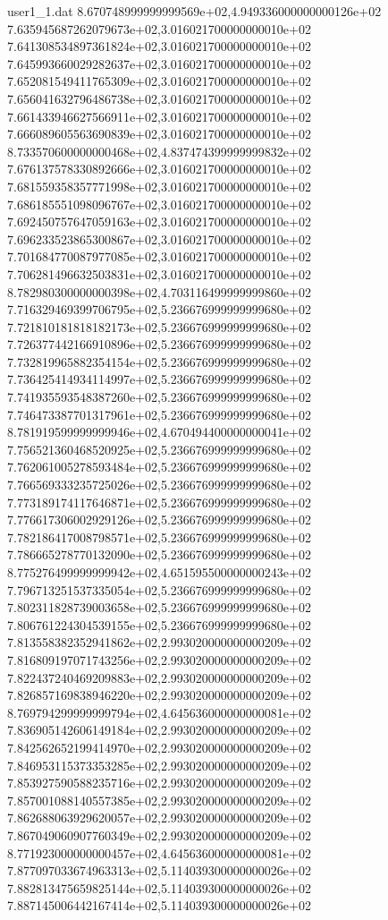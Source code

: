 \begin{filecontents}{user1_1.dat}
8.670748999999999569e+02,4.949336000000000126e+02
7.635945687262079673e+02,3.016021700000000010e+02
7.641308534897361824e+02,3.016021700000000010e+02
7.645993660029282637e+02,3.016021700000000010e+02
7.652081549411765309e+02,3.016021700000000010e+02
7.656041632796486738e+02,3.016021700000000010e+02
7.661433946627566911e+02,3.016021700000000010e+02
7.666089605563690839e+02,3.016021700000000010e+02
8.733570600000000468e+02,4.837474399999999832e+02
7.676137578330892666e+02,3.016021700000000010e+02
7.681559358357771998e+02,3.016021700000000010e+02
7.686185551098096767e+02,3.016021700000000010e+02
7.692450757647059163e+02,3.016021700000000010e+02
7.696233523865300867e+02,3.016021700000000010e+02
7.701684770087977085e+02,3.016021700000000010e+02
7.706281496632503831e+02,3.016021700000000010e+02
8.782980300000000398e+02,4.703116499999999860e+02
7.716329469399706795e+02,5.236676999999999680e+02
7.721810181818182173e+02,5.236676999999999680e+02
7.726377442166910896e+02,5.236676999999999680e+02
7.732819965882354154e+02,5.236676999999999680e+02
7.736425414934114997e+02,5.236676999999999680e+02
7.741935593548387260e+02,5.236676999999999680e+02
7.746473387701317961e+02,5.236676999999999680e+02
8.781919599999999946e+02,4.670494400000000041e+02
7.756521360468520925e+02,5.236676999999999680e+02
7.762061005278593484e+02,5.236676999999999680e+02
7.766569333235725026e+02,5.236676999999999680e+02
7.773189174117646871e+02,5.236676999999999680e+02
7.776617306002929126e+02,5.236676999999999680e+02
7.782186417008798571e+02,5.236676999999999680e+02
7.786665278770132090e+02,5.236676999999999680e+02
8.775276499999999942e+02,4.651595500000000243e+02
7.796713251537335054e+02,5.236676999999999680e+02
7.802311828739003658e+02,5.236676999999999680e+02
7.806761224304539155e+02,5.236676999999999680e+02
7.813558382352941862e+02,2.993020000000000209e+02
7.816809197071743256e+02,2.993020000000000209e+02
7.822437240469209883e+02,2.993020000000000209e+02
7.826857169838946220e+02,2.993020000000000209e+02
8.769794299999999794e+02,4.645636000000000081e+02
7.836905142606149184e+02,2.993020000000000209e+02
7.842562652199414970e+02,2.993020000000000209e+02
7.846953115373353285e+02,2.993020000000000209e+02
7.853927590588235716e+02,2.993020000000000209e+02
7.857001088140557385e+02,2.993020000000000209e+02
7.862688063929620057e+02,2.993020000000000209e+02
7.867049060907760349e+02,2.993020000000000209e+02
8.771923000000000457e+02,4.645636000000000081e+02
7.877097033674963313e+02,5.114039300000000026e+02
7.882813475659825144e+02,5.114039300000000026e+02
7.887145006442167414e+02,5.114039300000000026e+02

\end{filecontents}
